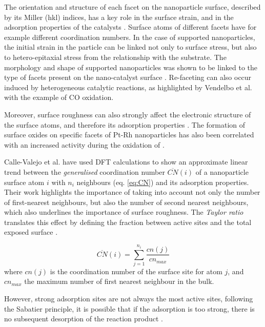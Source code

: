 The orientation and structure of each facet on the nanoparticle surface, described by its Miller (hkl) indices, has a key role in the surface strain, and in the adsorption properties of the catalysts \parencite{Zhou2012, Wu2017, Altantzis2019, Wu2021}.
Surface atoms of different facets have for example different coordination numbers.
In the case of supported nanoparticles, the initial strain in the particle can be linked not only to surface stress, but also to hetero-epitaxial stress from the relationship with the substrate.
The morphology and shape of supported nanoparticles was shown to be linked to the type of facets present on the nano-catalyst surface \parencite{Ndolomingo2020}.
Re-faceting can also occur induced by heterogeneous catalytic reactions, as highlighted by Vendelbo et al. \parencite*{Vendelbo2014} with the example of CO oxidation.

Moreover, surface roughness can also strongly affect the electronic structure of the surface atoms, and therefore its adsorption properties \parencite{Dicke2000, Hendriksen2010, Resta2020a}.
The formation of surface oxides on specific facets of Pt-Rh nanoparticles has also been correlated with an increased activity during the oxidation of  \parencite{Hejral2018}.

Calle-Valejo et al. \parencite*{CalleVallejo2014, CalleVallejo2015, CalleVallejo2018, CalleVallejo2023} have used DFT calculations to show an approximate linear trend between the \textit{generalised} coordination number $\overline{CN}(i)$ of a nanoparticle surface atom $i$ with $n_i$ neighbours (eq. \ref{eq:CN}) and its adsorption properties.
Their work highlights the importance of taking into account not only the number of first-nearest neighbours, but also the number of second nearest neighbours, which also underlines the importance of surface roughness.
The \textit{Taylor ratio} translates this effect by defining the fraction between active sites and the total exposed surface \parencite{Taylor1925}.

\begin{equation}
    \overline{CN}(i) = \sum_{j=1}^{n_i} \frac{cn(j)}{cn_{max}}
    \label{eq:CN}
\end{equation}
where $cn(j)$ is the coordination number of the surface site for atom $j$, and $cn_{max}$ the maximum number of first nearest neighbour in the bulk.

However, strong adsorption sites are not always the most active sites, following the Sabatier principle, it is possible that if the adsorption is too strong, there is no subsequent desorption of the reaction product \parencite{Nilsson2005, Jiang2009}.

